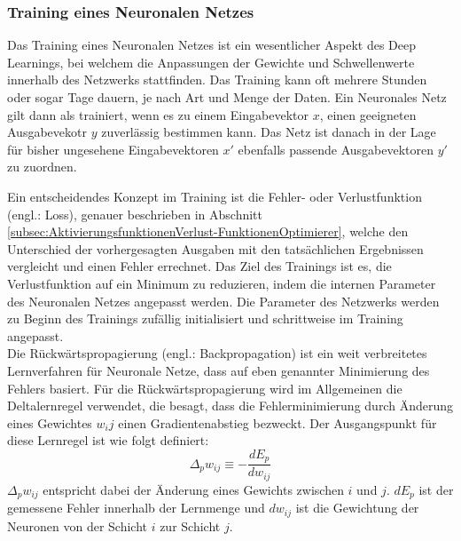 \subsubsection{Training eines Neuronalen Netzes}
Das Training eines Neuronalen Netzes ist ein wesentlicher Aspekt des Deep Learnings, bei welchem die Anpassungen der Gewichte und Schwellenwerte innerhalb des Netzwerks stattfinden. Das Training kann oft mehrere Stunden oder sogar Tage dauern, je nach Art und Menge der Daten. Ein Neuronales Netz gilt dann als trainiert, wenn es zu einem Eingabevektor $x$, einen geeigneten Ausgabevekotr $y$ zuverlässig bestimmen kann. Das Netz ist danach in der Lage für bisher ungesehene Eingabevektoren $x'$ ebenfalls passende Ausgabevektoren $y'$ zu zuordnen. \cite[vgl.][]{Scherer1997}

Ein entscheidendes Konzept im Training ist die Fehler- oder Verlustfunktion (engl.: Loss), genauer beschrieben in Abschnitt \ref{subsec:AktivierungsfunktionenVerlust-FunktionenOptimierer}, welche den Unterschied der vorhergesagten Ausgaben mit den tatsächlichen Ergebnissen vergleicht und einen Fehler errechnet. Das Ziel des Trainings ist es, die Verlustfunktion auf ein Minimum zu reduzieren, indem die internen Parameter des Neuronalen Netzes angepasst werden. Die Parameter des Netzwerks werden zu Beginn des Trainings zufällig initialisiert und schrittweise im Training angepasst. \cite[vgl.][]{Choo2020}\\
Die Rückwärtspropagierung (engl.: Backpropagation) ist ein weit verbreitetes Lernverfahren für Neuronale Netze, dass auf eben genannter Minimierung des Fehlers basiert. Für die Rückwärtspropagierung wird im Allgemeinen die Deltalernregel verwendet, die besagt, dass die Fehlerminimierung durch Änderung eines Gewichtes $w_ij$ einen Gradientenabstieg bezweckt. Der Ausgangspunkt für diese Lernregel ist wie folgt definiert: 
\begin{equation}
	\Delta_{p}w_{ij} \equiv -\dfrac{dE_p}{dw_{ij}}
\end{equation}
$\Delta_{p}w_{ij}$ entspricht dabei der Änderung eines Gewichts zwischen $i$ und $j$. $dE_p$ ist der gemessene Fehler innerhalb der Lernmenge und $dw_{ij}$ ist die Gewichtung der Neuronen von der Schicht $i$ zur Schicht $j$. \cite[vgl.][]{Rumelhart1986}

